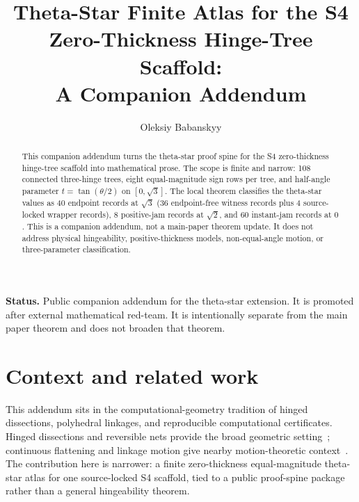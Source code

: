 \documentclass[11pt,a4paper]{article}
\title{Theta-Star Finite Atlas for the S4 Zero-Thickness Hinge-Tree Scaffold:\\
A Companion Addendum}
\author{Oleksiy Babanskyy}
\date{}
\theoremstyle{definition}
\theoremstyle{remark}
\begin{document}
\maketitle

\begin{abstract}
This companion addendum turns the theta-star proof spine for the S4 zero-thickness
hinge-tree scaffold into mathematical prose.  The scope is finite and narrow:
108 connected three-hinge trees, eight equal-magnitude sign rows per tree, and
half-angle parameter \(t=\tan(\theta/2)\) on \([0,\sqrt{3}]\).  The local theorem
classifies the theta-star values as 40 endpoint records at \(\sqrt{3}\)
(36 endpoint-free witness records plus 4 source-locked wrapper records), 8
positive-jam records at \(\sqrt{2}\), and 60 instant-jam records at \(0\).  This is a companion addendum, not a main-paper theorem update.  It does not address physical
hingeability, positive-thickness models, non-equal-angle motion, or
three-parameter classification.
\end{abstract}

\noindent\textbf{Status.} Public companion addendum for the theta-star extension.  It is promoted after external mathematical red-team. It is intentionally separate from the main paper theorem and does not broaden that theorem.

\section*{Context and related work}
This addendum sits in the computational-geometry tradition of hinged dissections, polyhedral linkages, and reproducible computational certificates.  Hinged dissections and reversible nets provide the broad geometric setting~\cite{abbott2007hinged,akiyama2018polyhedral,akiyama2016reversible,demaine2007gfalop}; continuous flattening and linkage motion give nearby motion-theoretic context~\cite{demaine2024continuous,demaine2001vertex}.  The contribution here is narrower: a finite zero-thickness equal-magnitude theta-star atlas for one source-locked S4 scaffold, tied to a public proof-spine package rather than a general hingeability theorem.












\end{document}
